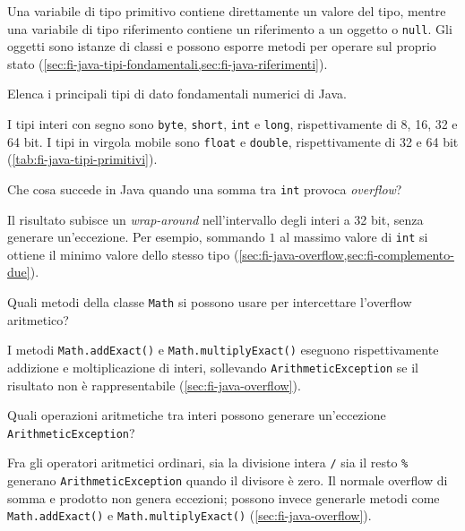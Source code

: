Una variabile di tipo primitivo contiene direttamente un valore del tipo,
mentre una variabile di tipo riferimento contiene un riferimento a un oggetto
o \texttt{null}. Gli oggetti sono istanze di classi e possono esporre metodi
per operare sul proprio stato
(\cref{sec:fi-java-tipi-fondamentali,sec:fi-java-riferimenti}).

\begin{exercise}
\label{ex:fi-esercizi-java-collaudo-tipi-numerici}
Elenca i principali tipi di dato fondamentali numerici di Java.
\end{exercise}

I tipi interi con segno sono \texttt{byte}, \texttt{short}, \texttt{int} e
\texttt{long}, rispettivamente di 8, 16, 32 e 64 bit. I tipi in virgola
mobile sono \texttt{float} e \texttt{double}, rispettivamente di 32 e 64 bit
(\cref{tab:fi-java-tipi-primitivi}).

\begin{exercise}
\label{ex:fi-esercizi-java-collaudo-overflow-int}
Che cosa succede in Java quando una somma tra \texttt{int} provoca
\emph{overflow}?
\end{exercise}

Il risultato subisce un \emph{wrap-around} nell'intervallo degli interi a
32 bit, senza generare un'eccezione. Per esempio, sommando \(1\) al
massimo valore di \texttt{int} si ottiene il minimo valore dello stesso tipo
(\cref{sec:fi-java-overflow,sec:fi-complemento-due}).

\begin{exercise}
\label{ex:fi-esercizi-java-collaudo-metodi-exact}
Quali metodi della classe \texttt{Math} si possono usare per intercettare
l'overflow aritmetico?
\end{exercise}

I metodi \texttt{Math.addExact()} e \texttt{Math.multiplyExact()} eseguono
rispettivamente addizione e moltiplicazione di interi, sollevando
\texttt{ArithmeticException} se il risultato non è rappresentabile
(\cref{sec:fi-java-overflow}).

\begin{exercise}
\label{ex:fi-esercizi-java-collaudo-arithmetic-exception}
Quali operazioni aritmetiche tra interi possono generare un'eccezione
\texttt{ArithmeticException}?
\end{exercise}

Fra gli operatori aritmetici ordinari, sia la divisione intera
\texttt{/} sia il resto \texttt{\%} generano
\texttt{ArithmeticException} quando il divisore è zero.
Il normale overflow di somma e prodotto non genera eccezioni;
possono invece generarle metodi come \texttt{Math.addExact()}
e \texttt{Math.multiplyExact()}
(\cref{sec:fi-java-overflow}).

